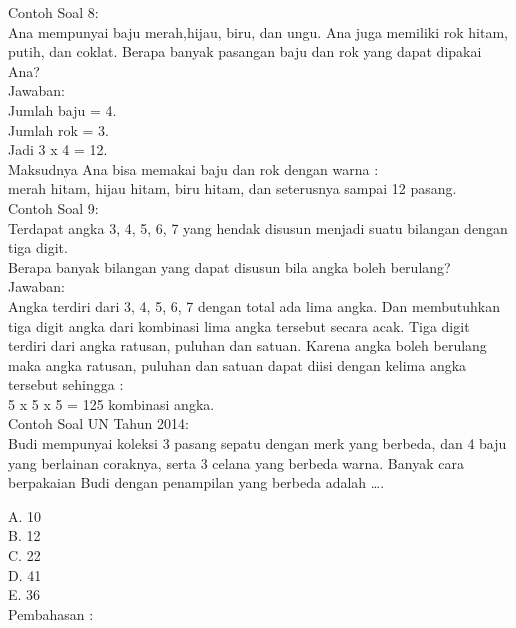 \documentclass[11pt,fleqn]{book} %
\begin{document}
Contoh Soal 8:\\

Ana mempunyai baju merah,hijau, biru, dan ungu. Ana juga memiliki rok hitam, putih, dan coklat. Berapa banyak pasangan baju dan rok yang dapat dipakai Ana?\\

Jawaban:\\

Jumlah baju = 4. \\
Jumlah rok = 3.\\
 Jadi 3 x 4 = 12.\\
 Maksudnya Ana bisa memakai baju dan rok dengan warna : \\
merah hitam, hijau hitam, biru hitam, dan seterusnya sampai 12 pasang.\\

Contoh Soal 9: \\

Terdapat angka 3, 4, 5, 6, 7 yang hendak disusun menjadi suatu bilangan dengan tiga digit. \\
Berapa banyak bilangan yang dapat disusun bila angka boleh berulang?\\

Jawaban:\\

Angka terdiri dari 3, 4, 5, 6, 7 dengan total ada lima angka. Dan membutuhkan tiga digit angka dari kombinasi lima angka tersebut secara acak. Tiga digit terdiri dari angka ratusan, puluhan dan satuan. Karena angka boleh berulang maka angka ratusan, puluhan dan satuan dapat diisi dengan kelima angka tersebut sehingga :\\

 5 x 5 x 5 = 125 kombinasi angka.\\
 
Contoh Soal UN Tahun 2014:\\

Budi mempunyai koleksi 3 pasang sepatu dengan merk yang berbeda, dan 4 baju yang berlainan coraknya, serta 3 celana yang berbeda warna. Banyak cara berpakaian Budi dengan penampilan yang berbeda adalah ….

A.   10\\
B.   12\\
C.   22\\
D.   41\\
E.   36\\

Pembahasan :\\
\end{document}
